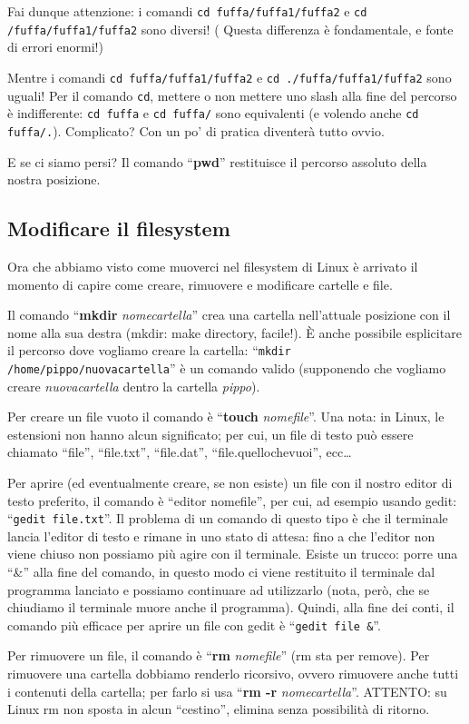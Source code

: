 Fai dunque attenzione: i comandi \verb|cd fuffa/fuffa1/fuffa2| e \verb|cd /fuffa/fuffa1/fuffa2| sono diversi! ( Questa differenza è fondamentale, e fonte di errori enormi!)

Mentre i comandi \verb|cd fuffa/fuffa1/fuffa2| e \verb|cd ./fuffa/fuffa1/fuffa2| sono uguali! Per il comando \verb|cd|, mettere o non mettere uno slash alla fine del percorso è indifferente: \verb|cd fuffa| e \verb|cd fuffa/| sono equivalenti (e volendo anche \verb|cd fuffa/.|). Complicato? Con un po' di pratica diventerà tutto ovvio. 

E se ci siamo persi? Il comando ``\textbf{pwd}'' restituisce il percorso assoluto della nostra posizione. 
\subsection{Modificare il filesystem}\label{modfile}
Ora che abbiamo visto come muoverci nel filesystem di Linux è arrivato il momento di capire come creare, rimuovere e modificare cartelle e file.

Il comando ``\textbf{mkdir} \emph{nomecartella}'' crea una cartella nell'attuale posizione con il nome alla sua destra (mkdir: make directory, facile!). È anche possibile esplicitare il percorso dove vogliamo creare la cartella: ``\verb|mkdir /home/pippo/nuovacartella|'' è un comando valido (supponendo che vogliamo creare \emph{nuovacartella} dentro la cartella \emph{pippo}).

Per creare un file vuoto il comando è ``\textbf{touch} \emph{nomefile}''. Una nota: in Linux, le estensioni non hanno alcun significato; per cui, un file di testo può essere chiamato ``file'', ``file.txt'', ``file.dat'', ``file.quellochevuoi'', ecc\ldots

Per aprire (ed eventualmente creare, se non esiste) un file con il nostro editor di testo preferito, il comando è ``editor nomefile'', per cui, ad esempio usando gedit: ``\verb|gedit file.txt|''. Il problema di un comando di questo tipo è che il terminale lancia l'editor di testo e rimane in uno stato di attesa: fino a che l'editor non viene chiuso non possiamo più agire con il terminale. Esiste un trucco: porre una ``\&'' alla fine del comando, in questo modo ci viene restituito il terminale dal programma lanciato e possiamo continuare ad utilizzarlo (nota, però, che se chiudiamo il terminale muore anche il programma). Quindi, alla fine dei conti, il comando più efficace per aprire un file con gedit è ``\verb|gedit file &|''. 

Per rimuovere un file, il comando è ``\textbf{rm} \emph{nomefile}'' (rm sta per remove). Per rimuovere una cartella dobbiamo renderlo ricorsivo, ovvero rimuovere anche tutti i contenuti della cartella; per farlo si usa ``\textbf{rm -r} \emph{nomecartella}''. ATTENTO: su Linux rm non sposta in alcun ``cestino'', elimina senza possibilità di ritorno.

